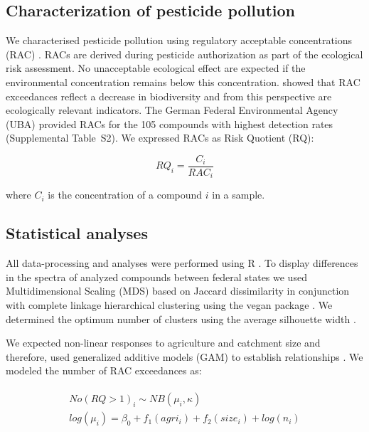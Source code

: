 \documentclass[journal=esthag,manuscript=article]{achemso}
\begin{document}
\subsection{Characterization of pesticide pollution}
We characterised pesticide pollution using regulatory acceptable concentrations (RAC) \citep{brock_linking_2010}.
RACs are derived during pesticide authorization as part of the ecological risk assessment.
No unacceptable ecological effect are expected if the environmental concentration remains below this concentration.
\citet{stehle_pesticide_2015} showed that RAC exceedances reflect a decrease in biodiversity and from this perspective are ecologically relevant indicators. 
The German Federal Environmental Agency (UBA) provided RACs for the 105 compounds with highest detection rates (Supplemental Table~S2). 
We expressed RACs as Risk Quotient (RQ):

\begin{equation}
RQ_i = \frac{C_i}{RAC_i}
\end{equation}

where $C_i$ is the concentration of a compound $i$ in a sample.


\subsection{Statistical analyses}
All data-processing and analyses were performed using R \citep{r_core_team_r:_2016}.
To display differences in the spectra of analyzed compounds between federal states we used Multidimensional Scaling (MDS) based on Jaccard dissimilarity in conjunction with complete linkage hierarchical clustering using the vegan package \citep{oksanen_vegan:_2016}.
We determined the optimum number of clusters using the average silhouette width \citep{rousseeuw1987silhouettes}. 

We expected non-linear responses to agriculture and catchment size and therefore, used generalized additive models (GAM) to establish relationships \citep{fewster_analysis_2000}.
We modeled the number of RAC exceedances as:

\begin{align}
\begin{split}
  No(RQ > 1)_i \sim NB(\mu_i, \kappa) \\
  log(\mu_i)= \beta_0 + f_1(agri_i) + f_2(size_i) + log(n_i) \\
\end{split}
\end{align}
\end{document}

